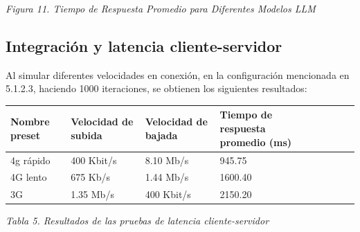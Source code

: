 \documentclass[10pt]{article}
\begin{document}
\vspace{1\baselineskip}
\begin{center}
\textit{Figura 11. Tiempo de Respuesta Promedio para Diferentes Modelos LLM}
\end{center}


\vspace{2\baselineskip}
\subsection{Integración y latencia cliente-servidor}

Al simular diferentes velocidades en conexión, en la configuración mencionada en 5.1.2.3,  haciendo 1000 iteraciones, se obtienen los siguientes resultados:

\begin{table}[H]
\begin{adjustbox}{max width=\textwidth}
\begin{tabular}{p{4.13cm}p{4.13cm}p{4.13cm}p{4.13cm}p{4.13cm}p{4.13cm}p{4.13cm}p{4.13cm}}
\hline
\multicolumn{1}{|p{4.13cm}}{\raggedright
Nombre preset} & 
\multicolumn{1}{|p{4.13cm}}{\raggedright
Velocidad de subida} & 
\multicolumn{1}{|p{4.13cm}}{\raggedright
Velocidad de bajada} & 
\multicolumn{1}{|p{4.13cm}|}{\raggedright
Tiempo de respuesta promedio (ms)} \\ 
\hline
\multicolumn{1}{|p{4.13cm}}{\raggedright
4g rápido} & 
\multicolumn{1}{|p{4.13cm}}{\textcolor[HTML]{0C0D0E}{400 Kbit/s}} & 
\multicolumn{1}{|p{4.13cm}}{\textcolor[HTML]{0C0D0E}{8.10 Mb/s}} & 
\multicolumn{1}{|p{4.13cm}|}{\raggedright
945.75} \\ 
\hline
\multicolumn{1}{|p{4.13cm}}{\raggedright
4G lento} & 
\multicolumn{1}{|p{4.13cm}}{\textcolor[HTML]{0C0D0E}{675 Kb/s}} & 
\multicolumn{1}{|p{4.13cm}}{\textcolor[HTML]{0C0D0E}{1.44 Mb/s}} & 
\multicolumn{1}{|p{4.13cm}|}{\raggedright
1600.40} \\ 
\hline
\multicolumn{1}{|p{4.13cm}}{\raggedright
3G} & 
\multicolumn{1}{|p{4.13cm}}{\textcolor[HTML]{0C0D0E}{1.35 Mb/s}} & 
\multicolumn{1}{|p{4.13cm}}{\textcolor[HTML]{0C0D0E}{400 Kbit/s}} & 
\multicolumn{1}{|p{4.13cm}|}{\raggedright
2150.20} \\ 
\hline
\end{tabular}
\end{adjustbox}
\end{table}
\vspace{2\baselineskip}
\begin{center}
\textit{Tabla 5. Resultados de las pruebas de latencia cliente-servidor}
\end{center}
\end{document}
